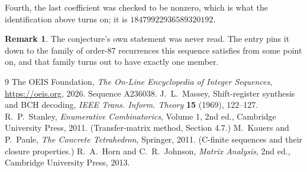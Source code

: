 \documentclass[11pt,a4paper]{article}
\theoremstyle{plain}
\theoremstyle{definition}
\newtheorem{remark}[theorem]{Remark}
\begin{document}
Fourth, the last coefficient was checked to be nonzero, which is what the identification above
turns on; it is $18479922936589320192$.

\begin{remark}
The conjecture's own statement was never read. The entry pins it down to the family of
order-$87$ recurrences this sequence satisfies from some point on, and that family turns
out to have exactly one member.
\end{remark}

\begin{thebibliography}{9}
 The OEIS Foundation, \emph{The On-Line Encyclopedia of Integer
Sequences}, \url{https://oeis.org}, 2026. Sequence A236038.
 J.~L.~Massey, Shift-register synthesis and BCH decoding, \emph{IEEE
Trans. Inform. Theory} \textbf{15} (1969), 122--127.
 R.~P.~Stanley, \emph{Enumerative Combinatorics}, Volume 1, 2nd ed.,
Cambridge University Press, 2011. (Transfer-matrix method, Section 4.7.)
 M.~Kauers and P.~Paule, \emph{The Concrete Tetrahedron}, Springer, 2011.
(C-finite sequences and their closure properties.)
 R.~A.~Horn and C.~R.~Johnson, \emph{Matrix Analysis}, 2nd ed., Cambridge
University Press, 2013.
\end{thebibliography}
\end{document}
